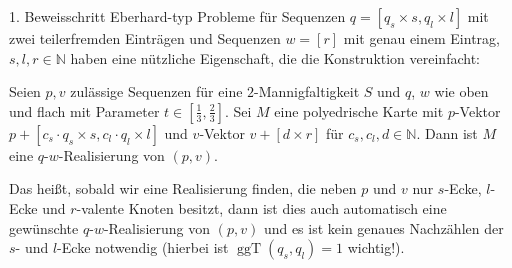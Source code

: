 \documentclass[10pt, notheorems]{beamer}
\newcommand{\nats}{\mathbb{N}}
\renewcommand{\gcd}{\operatorname{ggT}}
\begin{document}
\begin{frame}{1. Beweisschritt}{}
  {\sc Eberhard}-typ Probleme für Sequenzen $q = [q_s \times s, q_l \times l]$ mit zwei teilerfremden Einträgen und Sequenzen $w = [r]$ mit genau einem Eintrag, $s, l, r \in \nats$ haben eine nützliche Eigenschaft, die die Konstruktion vereinfacht:
  \begin{lemma}
    Seien $p, v$ zulässige Sequenzen für eine $2$-Mannigfaltigkeit $S$ und $q$, $w$ wie oben und flach mit Parameter $t \in \left[\tfrac{1}{3}, \tfrac{2}{3}\right]$. Sei $M$ eine polyedrische Karte mit $p$-Vektor $p + [c_s \cdot q_s \times s, c_l \cdot q_l \times l]$ und $v$-Vektor $v + [d \times r]$ für $c_s, c_l, d \in \nats$. Dann ist $M$ eine $q$-$w$-Realisierung von $(p, v)$.
  \end{lemma}
  \pause
  Das heißt, sobald wir eine Realisierung finden, die neben $p$ und $v$ nur $s$-Ecke, $l$-Ecke und $r$-valente Knoten besitzt, dann ist dies auch automatisch eine gewünschte $q$-$w$-Realisierung von $(p, v)$ und es ist kein genaues Nachzählen der \newline $s$- und $l$-Ecke notwendig (hierbei ist $\gcd(q_s, q_l) = 1$ wichtig!).
\end{frame}
\end{document}
